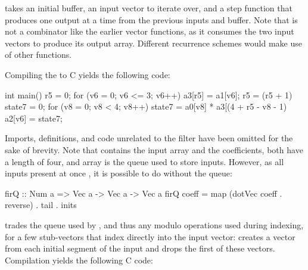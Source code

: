 \documentclass[../paper.tex]{subfiles}
\begin{document}

\noindent {} takes an initial buffer, an input vector to iterate over, and a step function that produces one output at a time from the previous inputs and buffer. Note that  is not a combinator like the earlier vector functions, as it consumes the two input vectors to produce its output array. Different recurrence schemes would make use of other functions. 


Compiling the  to C yields the following code:

\begin{code}
int main() {    
  r5 = 0;
  for (v6 = 0; v6 <= 3; v6++) {
    a3[r5] = a1[v6];
    r5 = (r5 + 1) %
    state7 = 0;
    for (v8 = 0; v8 < 4; v8++)
      state7 = a0[v8] * a3[(4 + r5 - v8 - 1) %
    a2[v6] = state7;
  }
}
\end{code}

\noindent Imports, definitions, and code unrelated to the filter have been omitted for the sake of brevity. Note that  contains the input array and  the coefficients, both have a length of four, and array  is the queue used to store inputs. However, as all inputs present at once , it is possible to do without the queue:


\begin{code}
firQ :: Num a => Vec a -> Vec a -> Vec a
firQ coeff = map (dotVec coeff . reverse) . tail . inits
\end{code}

 trades the queue used by , and thus any modulo operations used during indexing, for a few stub-vectors that index directly into the input vector:  creates a vector from each initial segment of the input and  drops the first of these vectors. Compilation yields the following C code:
\end{document}
